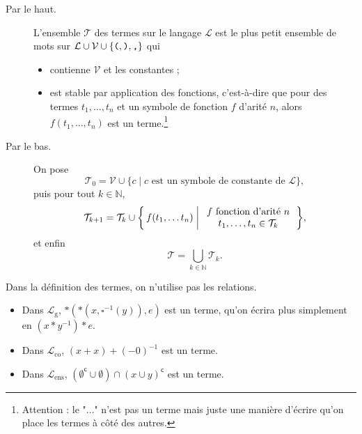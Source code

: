 \documentclass[./main]{subfiles}
\begin{document}
  \begin{defn}
    \begin{description}
      \item[Par le haut.]
        L'ensemble $\mathcal{T}$ des termes sur le langage $\mathcal{L}$ est le plus petit ensemble de mots sur $\mathcal{L} \cup \mathcal{V} \cup \{\verb|(|, \verb|)|, \verb|,|\}$ qui
        \begin{itemize}
          \item contienne $\mathcal{V}$ et les constantes ;
          \item est stable par application des fonctions, c'est-à-dire que pour des termes $t_1, \ldots, t_n$ et un symbole de fonction $f$ d'arité $n$, alors $f(t_1, \ldots, t_n)$ est un terme.\footnote{Attention : le "$\ldots$" n'est pas un terme mais juste une manière d'écrire qu'on place les termes à côté des autres.}
        \end{itemize}
      \item[Par le bas.]
        On pose \[
          \mathcal{T}_0 = \mathcal{V} \cup \{c  \mid c \text{ est un symbole de constante de } \mathcal{L} \} 
        ,\] 
      puis pour tout $k \in \mathds{N}$, \[
        \mathcal{T}_{k+1} = \mathcal{T}_k \cup \mleft\{\,f(t_1, \ldots t_n) \;\middle|\;
        \begin{array}{c}
          f \text{ fonction d'arité } n\\
          t_1, \ldots, t_n \in \mathcal{T}_k
        \end{array}\,\mright\}  
        ,\] et enfin \[
        \mathcal{T} = \bigcup_{k \in \mathds{N}} \mathcal{T}_k
        .\]
    \end{description}
  \end{defn}

  \begin{rmk}
    Dans la définition des termes, on n'utilise pas les relations.
  \end{rmk}

  \begin{exm}
    \begin{itemize}
      \item Dans $\mathcal{L}_\mathrm{g}$, $*(*(x,\square^{-1}(y)), e)$ est un terme, qu'on écrira plus simplement en $(x * y^{-1}) * e$.
      \item Dans $\mathcal{L}_\mathrm{co}$, $(x + x) + (-0)^{-1}$ est un terme.
      \item Dans $\mathcal{L}_\mathrm{ens}$, $(\emptyset^\mathsf{c} \cup \emptyset) \cap (x \cup y)^\mathsf{c}$ est un terme.
    \end{itemize}
  \end{exm}
\end{document}
